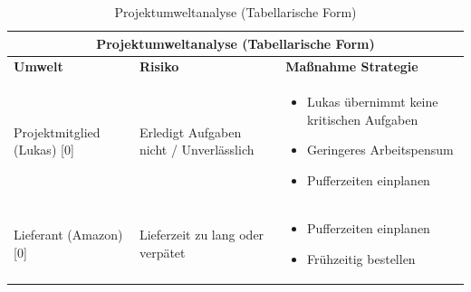 \begin{table}
    \centering
    \begin{tabular}{lp{}p{}}
        \multicolumn{3}{c}{\textbf{Projektumweltanalyse (Tabellarische Form)}}                                                 \\
        \toprule
        \textbf{Umwelt}             & \textbf{Risiko}                         & \textbf{Maßnahme Strategie}                    \\
        \midrule
        Projektmitglied (Lukas) [0] & Erledigt Aufgaben nicht / Unverlässlich & \begin{itemize}
                                                                                    \item Lukas übernimmt keine kritischen Aufgaben
                                                                                    \item Geringeres Arbeitspensum
                                                                                    \item Pufferzeiten einplanen
                                                                                \end{itemize} \\
        Lieferant (Amazon) [0]      & Lieferzeit zu lang oder verpätet        & \begin{itemize}
                                                                                    \item Pufferzeiten einplanen
                                                                                    \item Frühzeitig bestellen
                                                                                \end{itemize}                    \\
        \bottomrule
    \end{tabular}
    \caption{Projektumweltanalyse (Tabellarische Form)}
    \label{tab:projektumweltanalyse}
\end{table}